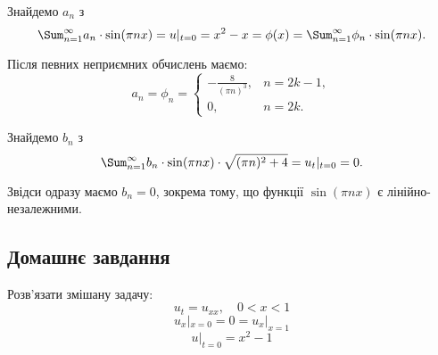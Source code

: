 \begin{solution}
	Знайдемо $a_n$ з
	\begin{equation*}
		\Sum_{n = 1}^\infty a_n \cdot \sin(\pi n x) = u|_{t = 0} = x^2 - x = \phi(x) = \Sum_{n = 1}^\infty \phi_n \cdot \sin(\pi n x).
	\end{equation*}

	Після певних неприємних обчислень маємо:
	\begin{equation*}
		a_n = \phi_n = \begin{cases} -\frac{8}{(\pi n)^3}, & n = 2 k - 1, \\ 0, & n = 2 k. \end{cases}
	\end{equation*}

	Знайдемо $b_n$ з
	\begin{equation*}
		\Sum_{n = 1}^\infty b_n \cdot \sin(\pi n x) \cdot \sqrt{(\pi n)^2 + 4} = u_t|_{t = 0} = 0.
	\end{equation*}
	
	Звідси одразу маємо $b_n = 0$, зокрема тому, що функції $\sin (\pi n x)$ є лінійно-незалежними.
\end{solution}

\subsection{Домашнє завдання}

\begin{problem}[Владіміров, №20.41.1]
	Розв'язати змішану задачу:
	\begin{equation*}
		u_t = u_{xx}, \quad 0 < x < 1	
	\end{equation*}
	\begin{equation*}
		u_x|_{x = 0} = 0 = u_x|_{x = 1}
	\end{equation*}
	\begin{equation*}
		u|_{t = 0} = x^2 - 1
	\end{equation*}
\end{problem}

